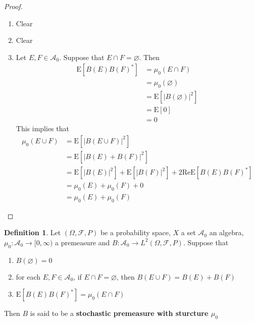 \documentclass[12pt]{amsart}
\theoremstyle{definition}
\newtheorem{defn}[definition]{Definition}
\renewcommand{\Re}{\text{Re}}
\newcommand{\Om}{\Omega}
\newcommand{\MA}{\mathcal{A}}
\newcommand{\MF}{\mathcal{F}}
\newcommand{\E}{\text{E}}
\newcommand{\Rg}{[0,\infty)}
\begin{document}
	\begin{proof}\
	\begin{enumerate}
	\item Clear 
	\item Clear
	\item Let $E, F \in \MA_0$. Suppose that $E \cap F = \varnothing$. Then 
	\begin{align*}
	\E[B(E)B(F)^*] 
	&= \mu_0(E \cap F) \\
	&= \mu_0(\varnothing) \\
	&= \E[|B(\varnothing)|^2] \\
	&= \E[0] \\
	&= 0
	\end{align*}
	This implies that 
	\begin{align*}
	\mu_0(E \cup F) 
	&= \E[|B(E \cup F)|^2] \\
	&= \E[|B(E) + B(F)|^2] \\
	&= \E[|B(E)|^2] + \E[|B(F)|^2] + 2 \Re \E[B(E)B(F)^*] \\
	&= \mu_0(E) + \mu_0(F) +0  \\
	&=  \mu_0(E) + \mu_0(F) 
	\end{align*}
	\end{enumerate}
	\end{proof}
	
	\begin{defn}
	Let $(\Om, \MF, P)$ be a probability space, $X$ a set $\MA_0$ an algebra, $\mu_0:\MA_0 \rightarrow \Rg$ a premeasure and $B:\MA_0 \rightarrow L^2(\Om, \MF, P)$. 
	Suppose that 
	\begin{enumerate}
	\item $B(\varnothing) = 0$
	\item for each $E, F \in \MA_0$, if $E \cap F = \varnothing$, then $B(E \cup F) = B(E) + B(F)$
	\item $\E [B(E)B(F)^*] = \mu_0(E \cap F)$
	\end{enumerate}
	Then $B$ is said to be a \textbf{stochastic premeasure with sturcture $\mu_0$}
	
	\end{defn}
	
\end{document}
